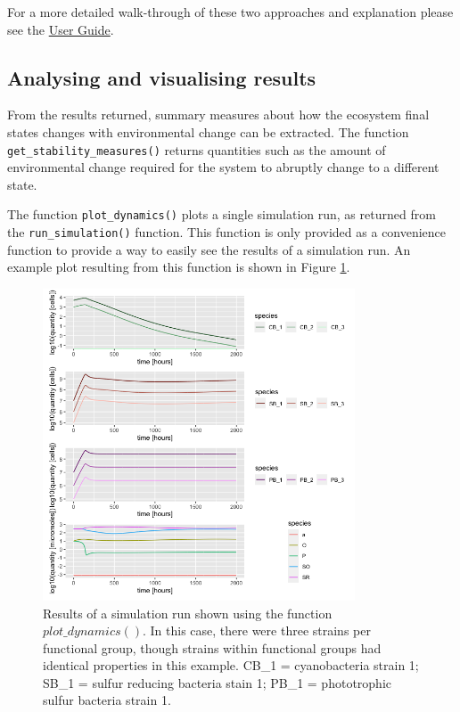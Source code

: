 \documentclass[]{elsarticle} %
\begin{document}
For a more detailed walk-through of these two approaches and explanation please see the \href{https://uzh-peg.r-universe.dev/articles/microxanox/User-guide.html}{User Guide}.

\subsection{Analysing and visualising results}\label{analysing-and-visualising-results}

From the results returned, summary measures about how the ecosystem final states changes with environmental change can be extracted. The function \texttt{get\_stability\_measures()} returns quantities such as the amount of environmental change required for the system to abruptly change to a different state.

The function \texttt{plot\_dynamics()} plots a single simulation run, as returned from the \texttt{run\_simulation()} function. This function is only provided as a convenience function to provide a way to easily see the results of a simulation run. An example plot resulting from this function is shown in Figure \ref{fig:plot-dynamics}.

\begin{figure}

{\centering \includegraphics[width=350px]{figures/ug_three_strains_dynamics} 

}

\caption{Results of a simulation run shown using the function $plot\_dynamics()$. In this case, there were three strains per functional group, though strains within functional groups had identical properties in this example. CB\_1 = cyanobacteria strain 1; SB\_1 = sulfur reducing bacteria stain 1; PB\_1 = phototrophic sulfur bacteria strain 1.}\label{fig:plot-dynamics}
\end{figure}
\end{document}
